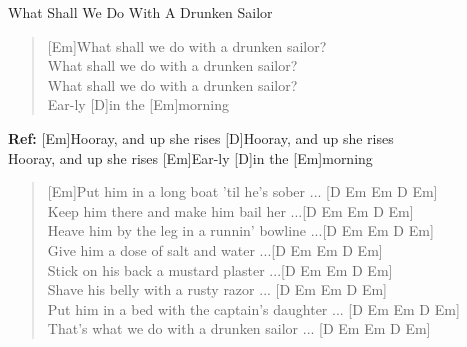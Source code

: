 \begin{song}{What Shall We Do With A Drunken Sailor}{}

    \begin{verse}  
        [Em]What shall we do with a drunken sailor? \\
        [D]What shall we do with a drunken sailor? \\
        [Em]What shall we do with a drunken sailor? \\
        [Em]Ear-ly [D]in the [Em]morning \\
    \end{verse}  

    \begin{chorus}
        \textbf{Ref:} [Em]Hooray, and up she rises [D]Hooray, and up she rises \\
        [Em]Hooray, and up she rises [Em]Ear-ly [D]in the [Em]morning 
    \end{chorus}

    \begin{verse}  
        [Em]Put him in a long boat 'til he's sober ... [D  Em  Em D Em]  \\
        [Em]Keep him there and make him bail her ...[D  Em  Em D Em] \\
        [Em]Heave him by the leg in a runnin' bowline ...[D  Em  Em D Em] \\
        [Em]Give him a dose of salt and water ...[D  Em  Em D Em] \\
        [Em]Stick on his back a mustard plaster ...[D  Em  Em D Em] \\
        [Em]Shave his belly with a rusty razor ... [D  Em  Em D Em] \\
        [Em]Put him in a bed with the captain's daughter ... [D  Em  Em D Em] \\
        [Em]That's what we do with a drunken sailor ... [D  Em  Em D Em] 
    \end{verse}  

\end{song}

